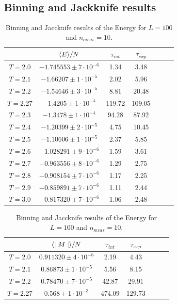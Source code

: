 \documentclass[article]{revtex4}
\newcommand{\qdist}[1]{\ifmmode\langle#1\rangle\else\textlangle#1\textrangle\fi}
\begin{document}
\subsection{Binning and Jackknife results}

\begin{table}[h!]
\center
\begin{subtable}{.5\textwidth}
\centering
\begin{tabular}{|c|c|c|c|c|c|c|}
\hline
&$\qdist{E}/N $ & $ \tau_{int} $& $ \tau_{exp} $\\
\hline
$T = 2.0$ &$-1.745553 \pm 7 \cdot10^{-6}$&1.34&3.48\\
\hline
$T = 2.1$ &$-1.66207 \pm 1 \cdot10^{-5}$&2.02&5.96\\
\hline
$T = 2.2$ &$-1.54646 \pm 3 \cdot10^{-5}$&8.81&20.48\\
\hline
$T = 2.27$ &$-1.4205 \pm 1 \cdot10^{-4}$&119.72&109.05\\
\hline
$T = 2.3$ &$-1.3478 \pm 1 \cdot10^{-4}$&94.28&87.92\\
\hline
$T = 2.4$ &$-1.20399 \pm 2 \cdot10^{-5}$&4.75&10.45\\
\hline
$T = 2.5$ &$-1.10606 \pm 1 \cdot10^{-5}$&2.37&5.85\\
\hline
$T = 2.6$ &$-1.028291 \pm 9 \cdot10^{-6}$&1.59&3.61\\
\hline
$T = 2.7$ &$-0.963556 \pm 8 \cdot10^{-6}$&1.29&2.75\\
\hline
$T = 2.8$ &$-0.908154 \pm 7 \cdot10^{-6}$&1.17&2.25\\
\hline
$T = 2.9$ &$-0.859891 \pm 7 \cdot10^{-6}$&1.11&2.44\\
\hline
$T = 3.0$&$-0.817320 \pm 7 \cdot10^{-6}$&1.06&2.48\\
\hline
\end{tabular}
\caption{Binning and Jaccknife results of the Energy for $L = 100$ and $n_{meas}=10$.}
\end{subtable}%
\begin{subtable}{.5\textwidth}
\centering
\begin{tabular}{|c|c|c|c|c|c|c|}
\hline
 &$\qdist{\mid M\mid}/N $ & $ \tau_{int} $& $ \tau_{exp} $\\
\hline
$T = 2.0$ &$0.911320 \pm 4 \cdot10^{-6}$&2.19&4.43\\
\hline
$T = 2.1$ &$0.86873 \pm 1 \cdot10^{-5}$&5.56&8.15\\
\hline
$T = 2.2$ &$0.78470 \pm 7 \cdot10^{-5}$&42.87&29.91\\
\hline
$T = 2.27$ &$0.568 \pm 1 \cdot10^{-3}$&474.09&129.73\\

\end{tabular}
\end{subtable}
\end{table}
\end{document}
